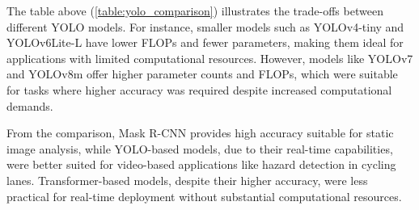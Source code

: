 \begin{table}[H]
\centering
{}
\caption{Comparison of YOLO architectures in terms of image size, model size, parameters, and FLOPs \citep{GarciaPajuelo2024, Sumit2020}.}
\label{table:yolo_comparison}
\end{table}


The table above (\ref{table:yolo_comparison}) illustrates the trade-offs between different YOLO models. For instance, smaller models such as YOLOv4-tiny and YOLOv6Lite-L have lower FLOPs and fewer parameters, making them ideal for applications with limited computational resources. However, models like YOLOv7 and YOLOv8m offer higher parameter counts and FLOPs, which were suitable for tasks where higher accuracy was required despite increased computational demands.

From the comparison, Mask R-CNN provides high accuracy suitable for static image analysis, while YOLO-based models, due to their real-time capabilities, were better suited for video-based applications like hazard detection in cycling lanes. Transformer-based models, despite their higher accuracy, were less practical for real-time deployment without substantial computational resources.
